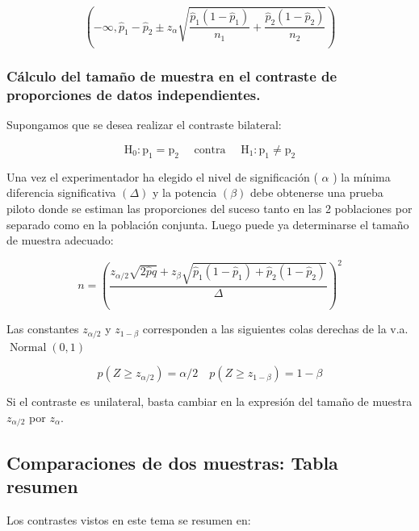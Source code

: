 \documentclass[
]{article}
\begin{document}
\[
\left(-\infty, \hat{p}_{1}-\hat{p}_{2} \pm z_{\alpha} \sqrt{\frac{\hat{p}_{1}\left(1-\hat{p}_{1}\right)}{n_{1}}+\frac{\hat{p}_{2}\left(1-\hat{p}_{2}\right)}{n_{2}}}\right)
\]

\subsubsection{Cálculo del tamaño de muestra en el contraste de proporciones de datos independientes.}\label{cuxe1lculo-del-tamauxf1o-de-muestra-en-el-contraste-de-proporciones-de-datos-independientes.}

Supongamos que se desea realizar el contraste bilateral:

\[
\mathrm{H}_{0}: \mathrm{p}_{1}=\mathrm{p}_{2} \quad \text { contra } \quad \mathrm{H}_{1}: \mathrm{p}_{1} \neq \mathrm{p}_{2}
\]

Una vez el experimentador ha elegido el nivel de significación ( \(\alpha\) ) la mínima diferencia significativa \((\Delta)\) y la potencia \((\beta)\) debe obtenerse una prueba piloto donde se estiman las proporciones del suceso tanto en las 2 poblaciones por separado como en la población conjunta. Luego puede ya determinarse el tamaño de muestra adecuado:

\[
n=\left(\frac{z_{\alpha / 2} \sqrt{2 \hat{p} \hat{q}}+z_{\beta} \sqrt{\hat{p}_{1}\left(1-\hat{p}_{1}\right)+\hat{p}_{2}\left(1-\hat{p}_{2}\right)}}{\Delta}\right)^{2}
\]

Las constantes \(z_{\alpha / 2}\) y \(z_{1-\beta}\) corresponden a las siguientes colas derechas de la v.a. \(\operatorname{Normal}(0,1)\)

\[
p\left(Z \geq z_{\alpha / 2}\right)=\alpha / 2 \quad p\left(Z \geq z_{1-\beta}\right)=1-\beta
\]

Si el contraste es unilateral, basta cambiar en la expresión del tamaño de muestra \(z_{\alpha / 2}\) por \(z_{\alpha}\).

\subsection{Comparaciones de dos muestras: Tabla resumen}\label{comparaciones-de-dos-muestras-tabla-resumen}

Los contrastes vistos en este tema se resumen en:
\end{document}
